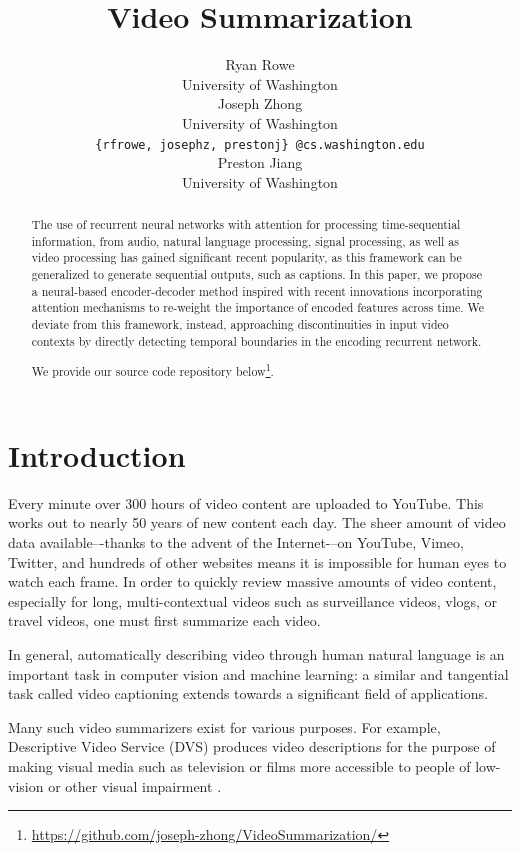\documentclass[11pt,a4paper]{article}
\title{Video Summarization}
\author{Ryan Rowe \\
  University of Washington \\ 
  \And
  Joseph Zhong \\
  University of Washington \\ 
  \texttt{\{rfrowe, josephz, prestonj\} @cs.washington.edu} \\
  \And
  Preston Jiang \\
  University of Washington \\ 
}
\date{}
\begin{document}
\maketitle
\begin{abstract}
    The use of recurrent neural networks with attention for processing time-sequential information, from audio, natural language processing, signal processing, as well as video processing has gained significant recent popularity, as this framework can be generalized to generate sequential outputs, such as captions. 
    In this paper, we propose a neural-based encoder-decoder method inspired with recent innovations incorporating attention mechanisms to re-weight the importance of encoded features across time. We deviate from this framework, instead, approaching discontinuities in input video contexts by directly detecting temporal boundaries in the encoding recurrent network.
    
    We provide our source code repository below\footnote{\url{https://github.com/joseph-zhong/VideoSummarization/}}.
\end{abstract}

\section{Introduction}


Every minute over 300 hours of video content are uploaded to YouTube.  This works out to nearly 50 years of new content each day.  The sheer amount of video data available–-thanks to the advent of the Internet-–on YouTube, Vimeo, Twitter, and hundreds of other websites means it is impossible for human eyes to watch each frame.  In order to quickly review massive amounts of video content, especially for long, multi-contextual videos such as surveillance videos, vlogs, or travel videos, one must first summarize each video.

In general, automatically describing video through human natural language is an important task in computer vision and machine learning: a similar and tangential task called video captioning extends towards a significant field of applications.

Many such video summarizers exist for various purposes.  For example, Descriptive Video Service (DVS) \cite{Dvs2019}  produces  video  descriptions  for  the  purpose  of  making  visual  media  such  as  television  or  films  more accessible to people of low-vision or other visual impairment \cite{Adp2019}. 
\end{document}
